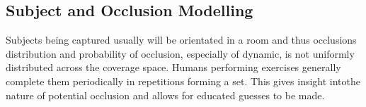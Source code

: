 

\subsection{Subject and Occlusion Modelling}
Subjects being captured usually will be orientated in a room and thus occlusions distribution and probability of occlusion, especially of dynamic, is not uniformly distributed across the coverage space.
Humans performing exercises generally complete them periodically in repetitions forming a set. This gives insight intothe nature of potential occlusion and allows for educated guesses to be made.

